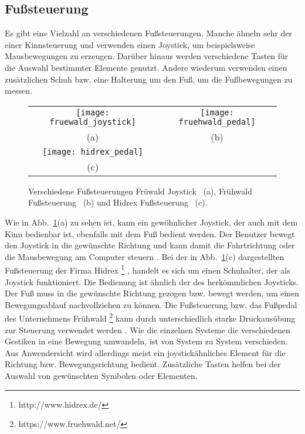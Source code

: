 \subsection{Fußsteuerung}

Es gibt eine Vielzahl an verschiedenen Fußsteuerungen. Manche ähneln sehr der einer Kinnsteuerung und verwenden einen Joystick, um beispielsweise Mausbewegungen zu erzeugen. Darüber hinaus werden verschiedene Tasten für die Auswahl bestimmter Elemente genutzt. Andere wiederum verwenden einen zusätzlichen Schuh bzw. eine Halterung um den Fuß, um die Fußbewegungen zu messen.
%
%
\begin{figure}
\centering\small
\setlength{\tabcolsep}{0mm}	%
\begin{tabular}{c@{\hspace{0mm}}c} %
  \texttt{[image: fruewald\_joystick]} &
  \texttt{[image: fruehwald\_pedal]}
\\
  (a) & (b)
\\[7pt]	%
  \texttt{[image: hidrex\_pedal]}
\\
  (c)
\end{tabular}
%
\caption{Verschiedene Fußsteuerungen \newline
Früwald Joystick \cite{FRUEHWALD}~(a), Frühwald Fußsteuerung \cite{FRUEHWALD}~(b) und Hidrex Fußsteuerung \cite{HIDREX}~(c).}
\label{fig:foot}
\end{figure}
%
%
\newline
Wie in Abb.~\ref{fig:foot}(a) zu sehen ist, kann ein gewöhnlicher Joystick, der auch mit dem Kinn bedienbar ist, ebenfalls mit dem Fuß bedient werden. Der Benutzer bewegt den Joystick in die gewünschte Richtung und kann damit die Fahrtrichtung oder die Mausbewegung am Computer steuern \cite{FRUEHWALD}. 
Bei der in Abb.~\ref{fig:foot}(c) dargestellten Fußsteuerung der Firma Hidrex %
\footnote{http://www.hidrex.de/}
%
, handelt es sich um einen Schuhalter, der als Joystick funktioniert. Die Bedienung ist ähnlich der des herkömmlichen Joysticks. Der Fuß muss in die gewünschte Richtung gezogen bzw. bewegt werden, um einen Bewegungsablauf nachvollziehen zu können.
Die Fußsteuerung bzw. das Fußpedal des Unternehmens Frühwald %
\footnote{https://www.fruehwald.net/}
%
kann durch unterschiedlich starke Druckausübung zur Steuerung verwendet werden \cite{FRUEHWALD}. 
%
\newline \newline \newline
Wie die einzelnen Systeme die verschiedenen Gestiken in eine Bewegung umwandeln, ist von System zu System verschieden. Aus Anwendersicht wird allerdings meist ein joystickähnliches Element für die Richtung bzw. Bewegungsrichtung bedient. Zusätzliche Tasten helfen bei der Auswahl von gewünschten Symbolen oder Elementen.

